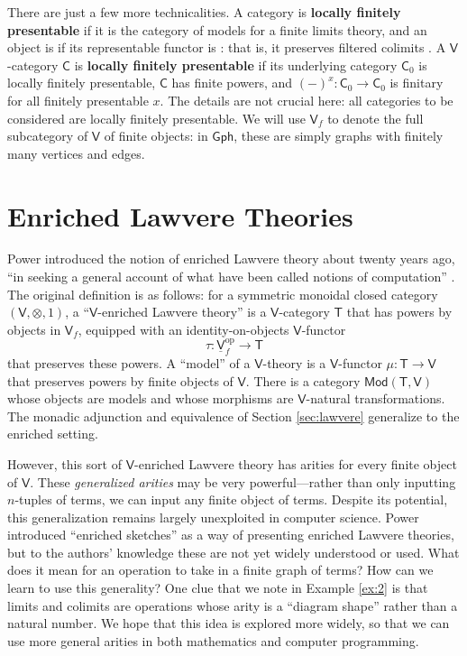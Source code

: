 \documentclass{amsart}
\newcommand{\define}[1]{{\bf \boldmath{#1}}}
\theoremstyle{definition}
\newcommand{\Gph}{\mathsf{Gph}}
\newcommand{\Mod}{\mathsf{Mod}}
\newcommand{\V}{\mathsf{V}}
\newcommand{\C}{\mathsf{C}}
\newcommand{\T}{\mathsf{T}}
\newcommand{\op}{\mathrm{op}}
\newcommand{\maps}{\colon}
\begin{document}
There are just a few more technicalities. A category is \textbf{locally finitely presentable} if it is the category of models for a finite limits theory, and an object is \define{finite} if its representable functor is \define{finitary}: that is, it preserves filtered colimits \cite{adamekrosicky}.   A $\V$-category $\C$ is \textbf{locally finitely presentable} if its underlying category $\C_0$ is locally finitely presentable, $\C$ has finite powers, and $(-)^x\maps \C_0 \to \C_0$ is finitary for all finitely presentable $x$.  The details are not crucial here: all categories to be considered are locally finitely presentable. We will use  $\V_f$ to denote the full subcategory of $\V$ of finite objects: in $\Gph$, these are simply graphs with finitely many vertices and edges.

\section{Enriched Lawvere Theories}
\label{sec:enriched_lawvere}

Power introduced the notion of enriched Lawvere theory about twenty years ago, ``in seeking a general account of what have been called notions of computation'' \cite{power}. The original definition is as follows: for a symmetric monoidal closed category $(\V,\otimes,1)$, a ``$\V$-enriched Lawvere theory'' is a $\V$-category $\T$ that has powers by objects in $\V_f$, equipped with an identity-on-objects $\V$-functor 
\[  \tau\maps \underline{\V}_f^\op \to \T \]
that preserves these powers.  A ``model'' of a $\V$-theory is a $\V$-functor $\mu\maps\T \to \V$ that preserves powers by finite objects of $\V$.  There is a category $\Mod(\T,\V)$ whose objects are models and whose morphisms are $\V$-natural transformations. The monadic adjunction and equivalence of Section \ref{sec:lawvere} generalize to the enriched setting.

However, this sort of $\V$-enriched Lawvere theory has arities for every finite object of $\V$.  These \textit{generalized arities} may be very powerful---rather than only inputting $n$-tuples of terms, we can input any finite object of terms.  Despite its potential, this generalization remains largely unexploited in computer science.   Power \cite{powsketch} introduced ``enriched sketches'' as a way of presenting enriched Lawvere theories, but to the authors' knowledge these are not yet widely understood or used.  What does it mean for an operation to take in a finite graph of terms?  How can we learn to use this generality? One clue that we note in Example \ref{ex:2} is that limits and colimits are operations whose arity is a ``diagram shape'' rather than a natural number. We hope that this idea is explored more widely, so that we can use more general arities in both mathematics and computer programming.
\end{document}
